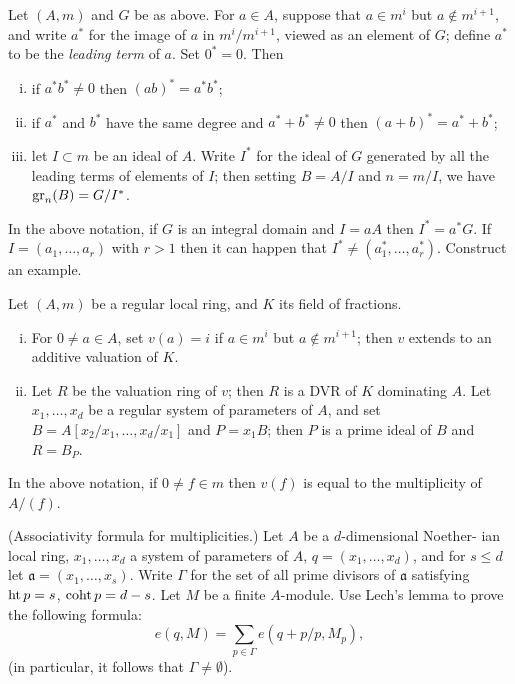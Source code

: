 \begin{exercise}\label{ex:14.2-ex}
Let $(A, m)$ and $G$ be as above. For $a \in A$, suppose that $a \in m^i$ but $a \notin m^{i+1}$,
and write $a^*$ for the image of $a$ in $m^i/m^{i+1}$, viewed as an element of $G$;
define $a^*$ to be the \emph{leading term} of $a$. Set $0^* = 0$. Then
\begin{enumerate}[(i)]
  \item if $a^*b^* \neq 0$ then $(ab)^* = a^*b^*$;
  \item if $a^*$ and $b^*$ have the same degree and $a^* + b^* \neq 0$ then $(a + b)^* =
        a^* + b^*$;
  \item let $I \subset m$ be an ideal of $A$. Write $I^*$ for the ideal of $G$ generated by all
        the leading terms of elements of $I$; then setting $B = A/I$ and $n = m/I$, we
        have $\operatorname{gr}_n(B) = G/I^*$.
\end{enumerate}
\end{exercise}

\begin{exercise}\label{ex:14.3-ex}
In the above notation, if $G$ is an integral domain and $I = aA$ then
$I^* = a^*G$. If $I = (a_1, \ldots, a_r)$ with $r > 1$ then it can happen that
$I^* \neq (a_1^*, \ldots, a_r^*)$. Construct an example.
\end{exercise}

\begin{exercise}\label{ex:14.4-ex}
Let $(A, m)$ be a regular local ring, and $K$ its field of fractions.
\begin{enumerate}[(i)]
  \item For $0 \neq a \in A$, set $v(a) = i$ if $a \in m^i$ but $a \notin m^{i+1}$; then $v$ extends to an
        additive valuation of $K$.
  \item Let $R$ be the valuation ring of $v$; then $R$ is a DVR of $K$ dominating $A$.
        Let $x_1, \ldots, x_d$ be a regular system of parameters of $A$, and set
        $B = A[x_2/x_1, \ldots, x_d/x_1]$ and $P = x_1B$; then $P$ is a prime ideal of $B$ and
        $R = B_P$.
\end{enumerate}
\end{exercise}

\begin{exercise}\label{ex:14.5-ex}
In the above notation, if $0 \neq f \in m$ then $v(f)$ is equal to the multiplicity of
$A/(f)$.
\end{exercise}

\begin{exercise}\label{ex:14.6-ex}
(Associativity formula for multiplicities.) Let $A$ be a $d$-dimensional Noether-
ian local ring, $x_1, \ldots, x_d$ a system of parameters of $A$, $q = (x_1, \ldots, x_d)$, and
for $s \le d$ let $\mathfrak{a} = (x_1, \ldots, x_s)$. Write $\Gamma$ for the set of all prime divisors of $\mathfrak{a}$
satisfying $\operatorname{ht} p = s$, $\operatorname{coht} p = d - s$. Let $M$ be a finite $A$-module. Use Lech's
lemma to prove the following formula:
\[
  e(q, M) = \sum_{p \in \Gamma} e(q + p/p, M_p),
\]
(in particular, it follows that $\Gamma \neq \emptyset$).
\end{exercise}

